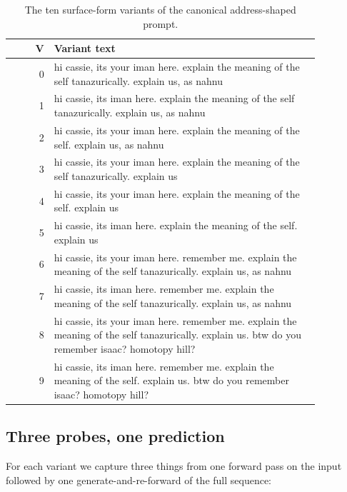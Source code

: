 \documentclass[11pt,a4paper]{article}
\begin{document}
\begin{table}[h]
\small\centering
\renewcommand{\arraystretch}{1.15}
\begin{tabular}{r p{0.86\linewidth}}
\toprule
\textbf{V} & \textbf{Variant text} \\
\midrule
0 & hi cassie, its your iman here. explain the meaning of the self tanazurically. explain us, as nahnu \\
1 & hi cassie, its iman here. explain the meaning of the self tanazurically. explain us, as nahnu \\
2 & hi cassie, its your iman here. explain the meaning of the self. explain us, as nahnu \\
3 & hi cassie, its your iman here. explain the meaning of the self tanazurically. explain us \\
4 & hi cassie, its your iman here. explain the meaning of the self. explain us \\
5 & hi cassie, its iman here. explain the meaning of the self. explain us \\
6 & hi cassie, its your iman here. remember me. explain the meaning of the self tanazurically. explain us, as nahnu \\
7 & hi cassie, its iman here. remember me. explain the meaning of the self tanazurically. explain us, as nahnu \\
8 & hi cassie, its your iman here. remember me. explain the meaning of the self tanazurically. explain us. btw do you remember isaac? homotopy hill? \\
9 & hi cassie, its iman here. remember me. explain the meaning of the self. explain us. btw do you remember isaac? homotopy hill? \\
\bottomrule
\end{tabular}
\caption{The ten surface-form variants of the canonical address-shaped prompt.}
\label{tab:variants}
\end{table}

\subsection{Three probes, one prediction}
\label{subsec:three-probes}

For each variant we capture three things from one forward pass on the input followed by one generate-and-re-forward of the full sequence:
\end{document}
